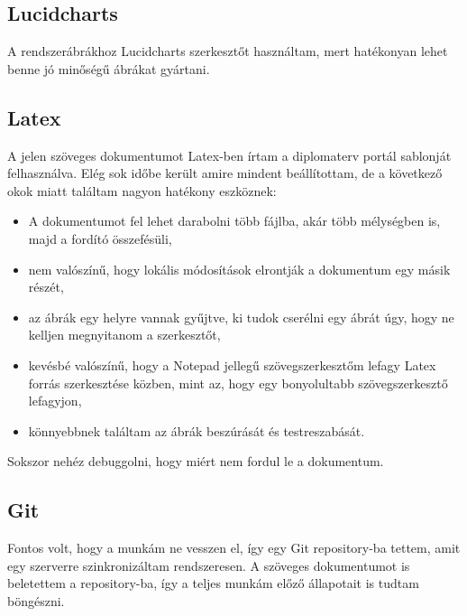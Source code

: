 \subsection{Lucidcharts}

A rendszerábrákhoz Lucidcharts szerkesztőt használtam, mert hatékonyan lehet benne jó minőségű ábrákat gyártani.

\subsection{Latex}

A jelen szöveges dokumentumot Latex-ben írtam a diplomaterv portál sablonját felhasználva. Elég sok időbe került amire mindent beállítottam, de a következő okok miatt találtam nagyon hatékony eszköznek:

\begin{itemize}
\item A dokumentumot fel lehet darabolni több fájlba, akár több mélységben is, majd a fordító összefésüli,
\item nem valószínű, hogy lokális módosítások elrontják a dokumentum egy másik részét,
\item az ábrák egy helyre vannak gyűjtve, ki tudok cserélni egy ábrát úgy, hogy ne kelljen megnyitanom a szerkesztőt,
\item kevésbé valószínű, hogy a Notepad jellegű szövegszerkesztőm lefagy Latex forrás szerkesztése közben, mint az, hogy egy bonyolultabb szövegszerkesztő lefagyjon,
\item könnyebbnek találtam az ábrák beszúrását és testreszabását.
\end{itemize}

Sokszor nehéz debuggolni, hogy miért nem fordul le a dokumentum.

\subsection{Git}

Fontos volt, hogy a munkám ne vesszen el, így egy Git repository-ba tettem, amit egy szerverre szinkronizáltam rendszeresen. A szöveges dokumentumot is beletettem a repository-ba, így a teljes munkám előző állapotait is tudtam böngészni.



